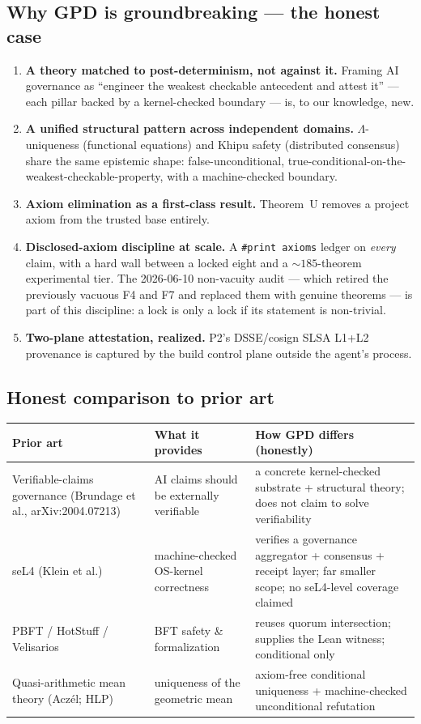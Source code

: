 \documentclass[11pt,letterpaper]{article}
\theoremstyle{definition}
\newcommand{\Lam}{\Lambda}
\begin{document}
\subsection{Why GPD is groundbreaking --- the honest case}
\begin{enumerate}
\item \textbf{A theory matched to post-determinism, not against it.} Framing AI
governance as ``engineer the weakest checkable antecedent and attest it'' --- each
pillar backed by a kernel-checked boundary --- is, to our knowledge, new.
\item \textbf{A unified structural pattern across independent domains.}
$\Lam$-uniqueness (functional equations) and Khipu safety (distributed consensus)
share the same epistemic shape: false-unconditional, true-conditional-on-the-
weakest-checkable-property, with a machine-checked boundary.
\item \textbf{Axiom elimination as a first-class result.} Theorem~U removes a
project axiom from the trusted base entirely.
\item \textbf{Disclosed-axiom discipline at scale.} A \texttt{\#print axioms}
ledger on \emph{every} claim, with a hard wall between a locked eight and a
${\sim}185$-theorem experimental tier. The 2026-06-10 non-vacuity audit --- which
retired the previously vacuous F4 and F7 and replaced them with genuine theorems
--- is part of this discipline: a lock is only a lock if its statement is
non-trivial.
\item \textbf{Two-plane attestation, realized.} P2's DSSE/cosign SLSA L1+L2
provenance is captured by the build control plane outside the agent's process.
\end{enumerate}

\subsection{Honest comparison to prior art}
\begin{center}\small
\begin{tabular}{@{}p{3.6cm}p{4.0cm}p{5.4cm}@{}}
\toprule
\textbf{Prior art} & \textbf{What it provides} & \textbf{How GPD differs (honestly)} \\
\midrule
Verifiable-claims governance (Brundage et al., arXiv:2004.07213) & AI claims should be externally verifiable & a concrete kernel-checked substrate + structural theory; does not claim to solve verifiability \\
seL4 (Klein et al.) & machine-checked OS-kernel correctness & verifies a governance aggregator + consensus + receipt layer; far smaller scope; no seL4-level coverage claimed \\
PBFT / HotStuff / Velisarios & BFT safety \& formalization & reuses quorum intersection; supplies the Lean witness; conditional only \\
Quasi-arithmetic mean theory (Acz\'el; HLP) & uniqueness of the geometric mean & axiom-free conditional uniqueness + machine-checked unconditional refutation \\
\bottomrule
\end{tabular}
\end{center}
\end{document}
